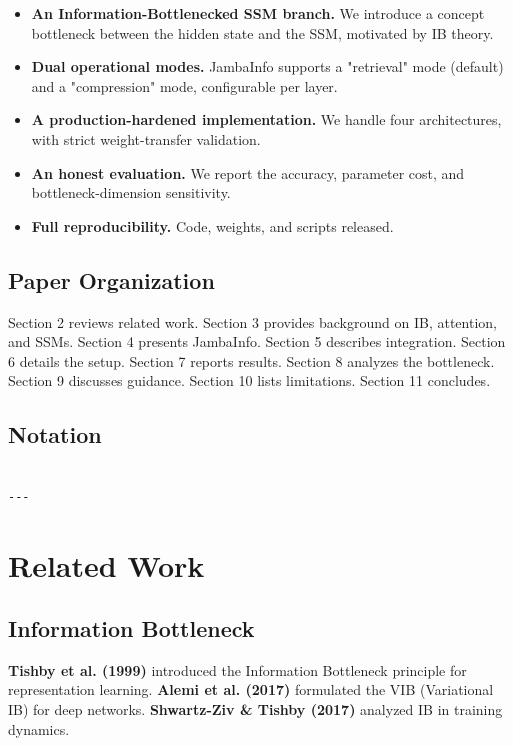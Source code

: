 \begin{itemize}
\item \textbf{An Information-Bottlenecked SSM branch.} We introduce a concept
  bottleneck between the hidden state and the SSM, motivated by IB theory.
\item \textbf{Dual operational modes.} JambaInfo supports a "retrieval" mode (default)
  and a "compression" mode, configurable per layer.
\item \textbf{A production-hardened implementation.} We handle four architectures,
  with strict weight-transfer validation.
\item \textbf{An honest evaluation.} We report the accuracy, parameter cost, and
  bottleneck-dimension sensitivity.
\item \textbf{Full reproducibility.} Code, weights, and scripts released.

\end{itemize}
\subsection{Paper Organization}

Section 2 reviews related work. Section 3 provides background on IB, 
attention, and SSMs. Section 4 presents JambaInfo. Section 5 describes 
integration. Section 6 details the setup. Section 7 reports results. 
Section 8 analyzes the bottleneck. Section 9 discusses guidance. Section 10 
lists limitations. Section 11 concludes.



\subsection{Notation}

\begin{lstlisting}

---
\end{lstlisting}

\section{Related Work}

\subsection{Information Bottleneck}

\textbf{Tishby et al. (1999)} introduced the Information Bottleneck principle 
for representation learning. \textbf{Alemi et al. (2017)} formulated the VIB 
(Variational IB) for deep networks. \textbf{Shwartz-Ziv \& Tishby (2017)} 
analyzed IB in training dynamics.


